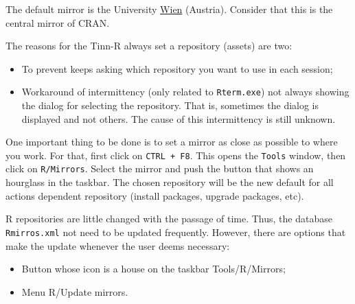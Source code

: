 The default mirror is the University \href{http://cran.at.r-project.org/}{Wien}
(Austria).
Consider that this is the central mirror of CRAN.

The reasons for the Tinn-R always set a repository (assets) are two:
\begin{itemize}
   \item To prevent \RR{} keeps asking which repository you want to use in each session;
   \item Workaround of intermittency (only related to \texttt{Rterm.exe}) not always showing the dialog for selecting the repository.
    That is, sometimes the dialog is displayed and not others. The cause of this intermittency is still unknown.
\end{itemize}

One important thing to be done is to set a \RR{} mirror as close as possible to where you work.
For that, first click on \texttt{CTRL + F8}.
This opens the \texttt{Tools} window, then click on \texttt{R/Mirrors}.
Select the \RR{} mirror and push the button that shows an hourglass in the taskbar.
The chosen repository will be the new default for all actions dependent repository
(install packages, upgrade packages, etc).

R repositories are little changed with the passage of time.
Thus, the database \texttt{Rmirros.xml} not need to be updated frequently.
However, there are options that make the update whenever the user deems necessary:
\begin{itemize}
   \item Button whose icon is a house on the taskbar Tools/R/Mirrors;
   \item Menu R/Update mirrors.
\end{itemize}
